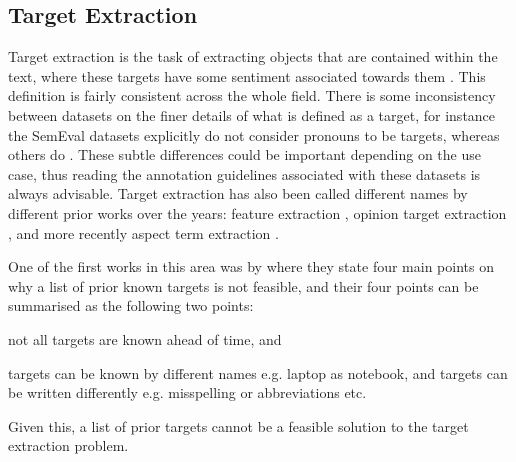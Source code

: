 \subsection{Target Extraction}
Target extraction is the task of extracting objects that are contained within the text, where these targets have some sentiment associated towards them \citep[Chapter~7]{hu2004mining_target_terms, wilson2008fine}. This definition is fairly consistent across the whole field. There is some inconsistency between datasets on the finer details of what is defined as a target, for instance the SemEval datasets \citep{pontiki-etal-2014-semeval, pontiki-etal-2015-semeval, pontiki-etal-2016-semeval} explicitly do not consider pronouns to be targets, whereas others do \citep{toprak-etal-2010-sentence, kessler2010icwsm}. These subtle differences could be important depending on the use case, thus reading the annotation guidelines associated with these datasets is always advisable. Target extraction has also been called different names by different prior works over the years: feature extraction \citep{hu2004mining_target_terms}, opinion target extraction \citep{qiu-etal-2011-opinion}, and more recently aspect term extraction \citep{pontiki-etal-2014-semeval}.


One of the first works in this area was by \citet{hu2004mining_target_terms} where they state four main points on why a list of prior known targets is not feasible, and their four points can be summarised as the following two points:
\begin{enumerate*}[label=\roman*)]
    \item not all targets are known ahead of time, and
    \item targets can be known by different names e.g. laptop as notebook, and targets can be written differently e.g. misspelling or abbreviations etc. 
\end{enumerate*}
Given this, a list of prior targets cannot be a feasible solution to the target extraction problem.

